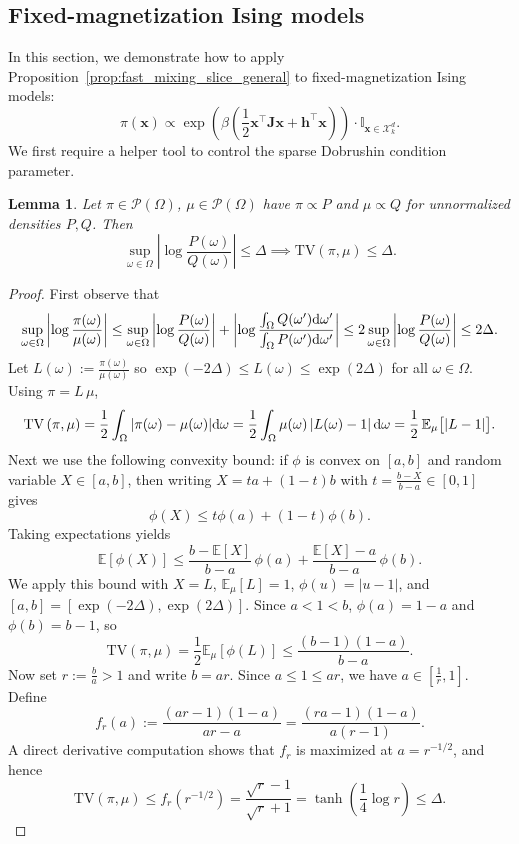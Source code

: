 \documentclass[11pt]{article}
\newtheorem{lemma}{Lemma}
\newcommand{\half}{\frac{1}{2}}
\newcommand{\1}{\mathbf{1}}
\newcommand{\0}{\mathbf{0}}
\newcommand{\ind}{\mathbb{I}}
\newcommand{\E}{\mathbb{E}}
\newcommand{\dd}{\textup{d}}
\newcommand{\Par}[1]{\left(#1\right)}
\newcommand{\Abs}[1]{\left|#1\right|}
\newcommand{\TV}[1]{\mathrm{TV}\left(#1\right)}
\newcommand{\mj}{{\mathbf{J}}}
\newcommand{\vh}{{\mathbf{h}}}
\newcommand{\vx}{{\mathbf{x}}}
\newcommand{\calP}{{\mathcal{P}}}
\newcommand{\calX}{{\mathcal{X}}}
\begin{document}
\subsection{Fixed-magnetization Ising models}\label{ssec:gen_ising}

In this section, we demonstrate how to apply Proposition~\ref{prop:fast_mixing_slice_general} to fixed-magnetization Ising models:
\begin{equation}\label{eq:ising_slice}\pi(\vx) \propto \exp\Par{\beta\Par{\half \vx^\top \mj \vx + \vh^\top \vx}} \cdot \ind_{\vx \in \calX^d_k}.\end{equation}
We first require a helper tool to control the sparse Dobrushin condition parameter.

\begin{lemma}\label{lem:tv-tanh}
Let $\pi \in \calP(\Omega)$, $\mu \in \calP(\Omega)$ have $\pi \propto P$ and $\mu \propto Q$ for unnormalized densities $P, Q$. Then
\[\sup_{\omega \in \Omega} \Abs{\log \frac{P(\omega)}{Q(\omega)}} \le \Delta \implies \TV{\pi, \mu} \le \Delta.\]
\end{lemma}

\begin{proof}
First observe that
\begin{equation*}
    \sup_{\omega \in \Omega} \Abs{\log \frac{\pi(\omega)}{\mu(\omega)}} \le \sup_{\omega \in \Omega}\Abs{\log \frac{P(\omega)}{Q(\omega)}} + \Abs{\log\frac{\int_{\Omega} Q(\omega') \dd \omega'}{\int_{\Omega} P(\omega')\dd\omega'}} \le 2\sup_{\omega\in\Omega} \Abs{\log \frac{P(\omega)}{Q(\omega)}} \le 2\Delta.
\end{equation*}
Let $L(\omega):=\frac{\pi(\omega)}{\mu(\omega)}$ so $\exp(-2\Delta)\le L(\omega)\le \exp(2\Delta)$ for all $\omega \in \Omega$.
Using $\pi= L\,\mu$,
\[
\TV{\pi, \mu}
=\frac12\int_\Omega |\pi(\omega)-\mu(\omega)|\dd\omega
=\frac12 \int_\Omega \mu(\omega)\Abs{L(\omega) - 1}\dd\omega
=\frac12\,\E_\mu\bigl[|L-1|\bigr].
\]
Next we use the following convexity bound: if $\phi$ is convex on $[a,b]$ and random variable $X\in[a,b]$, then writing
$X=t a+(1-t)b$ with $t=\frac{b-X}{b-a}\in[0,1]$ gives
\[
\phi(X)\le t\phi(a)+(1-t)\phi(b).
\]
Taking expectations yields
\[
\E[\phi(X)]\le \frac{b-\E[X]}{b-a}\,\phi(a)+\frac{\E[X]-a}{b-a}\,\phi(b).
\]
We apply this bound with $X=L$, $\E_\mu[L]=1$, $\phi(u)=|u-1|$, and $[a, b] = [\exp(-2\Delta), \exp(2\Delta)]$. Since $a< 1 < b$,
$\phi(a)=1-a$ and $\phi(b)=b-1$, so
\[
\TV{\pi, \mu} = \frac{1}{2}\E_\mu[\phi(L)]\le \frac{(b-1)(1-a)}{b-a}.
\]
Now set $r:=\frac b a>1$ and write $b=ar$. Since $a\le 1\le ar$, we have $a\in[\frac 1 r,1]$. Define
\[
f_r(a):=\frac{(ar-1)(1-a)}{ar-a}=\frac{(ra-1)(1-a)}{a(r-1)}.
\]
A direct derivative computation shows that $f_r$ is maximized at $a=r^{-1/2}$, and hence
\[
\TV{\pi, \mu}\le f_r(r^{-1/2})
=\frac{\sqrt r-1}{\sqrt r+1} =\tanh\Par{\frac14\log r} \leq \Delta.
\]
\end{proof}
\end{document}
